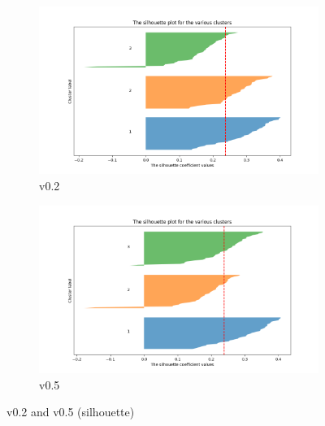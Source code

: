 \documentclass[a4paper,12pt]{article}
\begin{document}
\begin{figure}[H]
\centering
\begin{subfigure}{0.48\textwidth}
\includegraphics[width=\linewidth]{results_silhouette_v2.png}
\caption{v0.2}
\end{subfigure}
\hfill
\begin{subfigure}{0.48\textwidth}
\includegraphics[width=\linewidth]{results_silhouette_v0_5.png}
\caption{v0.5}
\end{subfigure}
\caption{v0.2 and v0.5 (silhouette)}
\end{figure}
\end{document}
